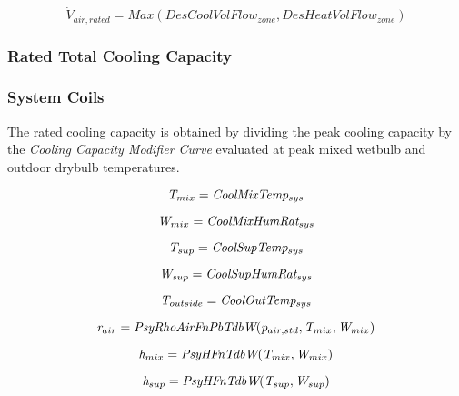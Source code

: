\begin{equation}
\dot V_{air,rated} = Max(DesCoolVolFlow_{zone},DesHeatVolFlow_{zone})
\end{equation}

\subsubsection{Rated Total Cooling Capacity}\label{rated-total-cooling-capacity-2}

\subsubsection{System Coils}\label{system-coils-5}

The rated cooling capacity is obtained by dividing the peak cooling capacity by the \emph{Cooling Capacity Modifier Curve} evaluated at peak mixed wetbulb and outdoor drybulb temperatures.

\begin{equation}
\emph{T\(_{mix}\)} = \emph{CoolMixTemp\(_{sys}\)}
\end{equation}

\begin{equation}
\emph{W\(_{mix}\)} = \emph{CoolMixHumRat\(_{sys}\)}
\end{equation}

\begin{equation}
\emph{T\(_{sup}\)} = \emph{CoolSupTemp\(_{sys}\)}
\end{equation}

\begin{equation}
\emph{W\(_{sup}\)} = \emph{CoolSupHumRat\(_{sys}\)}
\end{equation}

\begin{equation}
\emph{T\(_{outside}\)} = \emph{CoolOutTemp\(_{sys}\)}
\end{equation}

\begin{equation}
\emph{r\(_{air}\)} = \emph{PsyRhoAirFnPbTdbW}(\emph{p\(_{air,std}\)}, \emph{T\(_{mix}\)},\emph{W\(_{mix}\)})
\end{equation}

\begin{equation}
\emph{h\(_{mix}\)} = \emph{PsyHFnTdbW}(\emph{T\(_{mix}\)},\emph{W\(_{mix}\)})
\end{equation}

\begin{equation}
\emph{h\(_{sup}\)} = \emph{PsyHFnTdbW}(\emph{T\(_{sup}\)},\emph{W\(_{sup}\)})
\end{equation}

